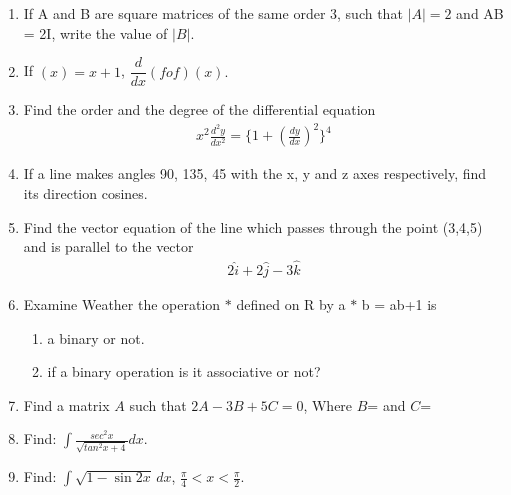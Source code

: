 \documentclass{article}
\begin{document}
\begin{enumerate}
  
\item If A and B are square matrices of the same order 3, such that $|A| = 2 $ and AB = 2I,
write the value of $|B|$.
  
 \item If $(x) = x + 1 $, $\dfrac{d}{dx}(fof) (x).$
 \item Find the order and the degree of the differential equation
 \begin{align*}
 x^{2}\frac{d^{2}y}{dx^{2}}=\{1+(\frac{dy}{dx})^{2}\}^{4}
 \end{align*}
\item If a line makes angles 90\degree{}, 135\degree{}, 45\degree{} with the x, y and z axes respectively, find its direction cosines.
\item Find the vector equation of the line which passes through the point (3,4,5) and is parallel to the vector 
\begin{align*}
 2\hat{i} + 2\hat{j} - 3\hat{k}  
\end{align*}
\item Examine Weather the operation $*$ defined on R by a $*$ b = ab+1 is
\begin{enumerate}
    \item a binary or not.
    \item if a binary operation is it associative or not?
\end{enumerate}
\item Find a matrix $A$ such that $2A - 3B + 5C = 0$, Where $B$= and $C$=
\item  Find:  $\int\frac{sec^2x}{\sqrt{tan^2x+4}}dx.$
\item Find: $\int \sqrt{1-\sin 2x} \, dx$, $\frac{\pi}{4} < x < \frac{\pi}{2}$.


\end{enumerate}
\end{document}
